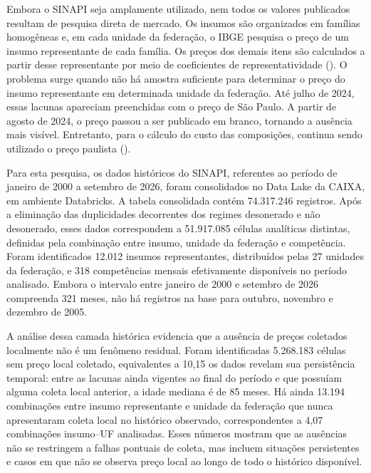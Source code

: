 Embora o SINAPI seja amplamente utilizado, nem todos os valores publicados resultam de 
pesquisa direta de mercado. Os insumos são organizados em famílias homogêneas e, em cada 
unidade da federação, o IBGE pesquisa o preço de um insumo representante de cada família. 
Os preços dos demais itens são calculados a partir desse representante por meio de 
coeficientes de representatividade (). O problema surge 
quando não há amostra suficiente para determinar o preço do insumo representante em 
determinada unidade da federação. Até julho de 2024, essas lacunas apareciam preenchidas 
com o preço de São Paulo. A partir de agosto de 2024, o preço passou a ser publicado em 
branco, tornando a ausência mais visível. Entretanto, para o cálculo do custo das 
composições, continua sendo utilizado o preço paulista ().

Para esta pesquisa, os dados históricos do SINAPI, referentes ao período de janeiro de 
2000 a setembro de 2026, foram consolidados no Data Lake da CAIXA, em ambiente Databricks. 
A tabela consolidada contém 74.317.246 registros. Após a eliminação das duplicidades 
decorrentes dos regimes desonerado e não desonerado, esses dados correspondem a 
51.917.085 células analíticas distintas, definidas pela combinação entre insumo, unidade 
da federação e competência. Foram identificados 12.012 insumos representantes, 
distribuídos pelas 27 unidades da federação, e 318 competências mensais efetivamente 
disponíveis no período analisado. Embora o intervalo entre janeiro de 2000 e setembro de 
2026 compreenda 321 meses, não há registros na base para outubro, novembro e dezembro de 
2005.

A análise dessa camada histórica evidencia que a ausência de preços coletados localmente 
não é um fenômeno residual. Foram identificadas 5.268.183 células sem preço local coletado, 
equivalentes a 10,15%
os dados revelam sua persistência temporal: entre as lacunas ainda vigentes ao final do 
período e que possuíam alguma coleta local anterior, a idade mediana é de 85 meses. Há 
ainda 13.194 combinações entre insumo representante e unidade da federação que nunca 
apresentaram coleta local no histórico observado, correspondentes a 4,07%
combinações insumo–UF analisadas. Esses números mostram que as ausências não se restringem 
a falhas pontuais de coleta, mas incluem situações persistentes e casos em que não se 
observa preço local ao longo de todo o histórico disponível.

